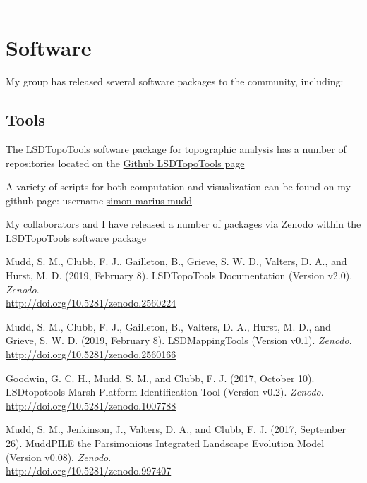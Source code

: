 \documentclass[10pt, a4paper]{article}
\newcommand{\years}[1]{\marginnote{\scriptsize #1}}
\begin{document}
\hrule
\section*{Software}
My group has released several software packages to the community, including:
\subsection*{Tools}

\years{Github}The LSDTopoTools software package for topographic analysis has a number of repositories located on the \href{https://github.com/LSDtopotools}{Github LSDTopoTools page}\par
A variety of scripts for both computation and visualization can be found on my github page: username \href{https://github.com/simon-m-mudd}{simon-marius-mudd}\par


\years{Zenodo}My collaborators and I have released a number of packages via Zenodo within the \href{https://zenodo.org/search?page=1&size=20&q=lsdtopotools}{LSDTopoTools software package}\par
Mudd, S. M., Clubb, F. J., Gailleton, B., Grieve, S. W. D., Valters, D. A., and Hurst, M. D. (2019, February 8). LSDTopoTools Documentation (Version v2.0). \textit{Zenodo}.\\ \href{http://doi.org/10.5281/zenodo.2560224}{http://doi.org/10.5281/zenodo.2560224}\par

Mudd, S. M., Clubb, F. J., Gailleton, B., Valters, D. A., Hurst, M. D., and Grieve, S. W. D. (2019, February 8). LSDMappingTools (Version v0.1). \textit{Zenodo}.\\ \href{http://doi.org/10.5281/zenodo.2560166}{http://doi.org/10.5281/zenodo.2560166}\par

Goodwin, G. C. H., Mudd, S. M., and Clubb, F. J. (2017, October 10). LSDtopotools Marsh Platform Identification Tool (Version v0.2). \textit{Zenodo}.\\ \href{http://doi.org/10.5281/zenodo.1007788}{http://doi.org/10.5281/zenodo.1007788}\par

Mudd, S. M., Jenkinson, J., Valters, D. A., and Clubb, F. J. (2017, September 26). MuddPILE the Parsimonious Integrated Landscape Evolution Model (Version v0.08). \textit{Zenodo}.\\ \href{http://doi.org/10.5281/zenodo.997407}{http://doi.org/10.5281/zenodo.997407}\par
\end{document}
